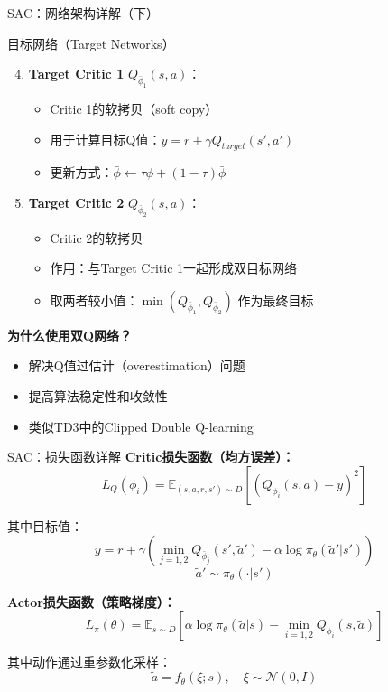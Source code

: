 \documentclass{beamer}
\begin{document}
\begin{frame}{SAC：网络架构详解（下）}
    \begin{block}{目标网络（Target Networks）}
        \begin{enumerate}
            \setcounter{enumi}{3}
            \item \textbf{Target Critic 1} $Q_{\bar{\phi}_1}(s,a)$：
            \begin{itemize}
                \item Critic 1的软拷贝（soft copy）
                \item 用于计算目标Q值：$y = r + \gamma Q_{target}(s', a')$
                \item 更新方式：$\bar{\phi} \leftarrow \tau \phi + (1-\tau) \bar{\phi}$
            \end{itemize}
            
            \item \textbf{Target Critic 2} $Q_{\bar{\phi}_2}(s,a)$：
            \begin{itemize}
                \item Critic 2的软拷贝
                \item 作用：与Target Critic 1一起形成双目标网络
                \item 取两者较小值：$\min(Q_{\bar{\phi}_1}, Q_{\bar{\phi}_2})$ 作为最终目标
            \end{itemize}
        \end{enumerate}
    \end{block}
    
    \vspace{0.3cm}
    
    \textbf{为什么使用双Q网络？}
    \begin{itemize}
        \item 解决Q值过估计（overestimation）问题
        \item 提高算法稳定性和收敛性
        \item 类似TD3中的Clipped Double Q-learning
    \end{itemize}
\end{frame}

\begin{frame}{SAC：损失函数详解}
    \textbf{Critic损失函数（均方误差）：}
    \[
    L_Q(\phi_i) = \mathbb{E}_{(s,a,r,s') \sim D} \left[ \left( Q_{\phi_i}(s,a) - y \right)^2 \right]
    \]
    
    其中目标值：
    \[
    y = r + \gamma \left( \min_{j=1,2} Q_{\bar{\phi}_j}(s', \tilde{a}') - \alpha \log \pi_\theta(\tilde{a}'|s') \right)
    \]
    \[
    \tilde{a}' \sim \pi_\theta(\cdot|s')
    \]
    
    \vspace{0.3cm}
    
    \textbf{Actor损失函数（策略梯度）：}
    \[
    L_\pi(\theta) = \mathbb{E}_{s \sim D} \left[ \alpha \log \pi_\theta(\tilde{a}|s) - \min_{i=1,2} Q_{\phi_i}(s, \tilde{a}) \right]
    \]
    
    其中动作通过重参数化采样：
    \[
    \tilde{a} = f_\theta(\xi; s), \quad \xi \sim \mathcal{N}(0, I)
    \]
    
    \cite{haarnoja2018softactorcriticoffpolicymaximum}
\end{frame}
\end{document}
